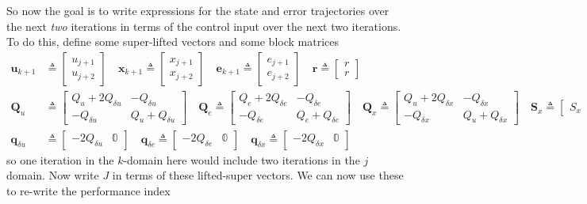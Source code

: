 \documentclass[landscape]{article}
\begin{document}
So now the goal is to write expressions for the state and error trajectories over the next \textit{two} iterations in terms of the control input over the next two iterations.  To do this, define some super-lifted vectors and some block matrices
\begin{align}
\mathbf{u}_{k+1}&\triangleq \begin{bmatrix} u_{j+1} \\ u_{j+2}\end{bmatrix} \quad
\mathbf{x}_{k+1} \triangleq \begin{bmatrix} x_{j+1} \\ x_{j+2}\end{bmatrix} \quad
\mathbf{e}_{k+1} \triangleq \begin{bmatrix} e_{j+1} \\ e_{j+2}\end{bmatrix} \quad
\mathbf{r}       \triangleq \begin{bmatrix} r       \\ r      \end{bmatrix} \\
\mathbf{Q}_u    &\triangleq \begin{bmatrix} Q_u + 2 Q_{\delta u} & - Q_{\delta u} \\ - Q_{\delta u} & Q_u + Q_{\delta u} \end{bmatrix} \quad
\mathbf{Q}_e     \triangleq \begin{bmatrix} Q_e + 2 Q_{\delta e} & - Q_{\delta e} \\ - Q_{\delta e} & Q_e + Q_{\delta e} \end{bmatrix} \quad
\mathbf{Q}_x     \triangleq \begin{bmatrix} Q_u + 2 Q_{\delta x} & - Q_{\delta x} \\ - Q_{\delta x} & Q_u + Q_{\delta x} \end{bmatrix} \quad
\mathbf{S}_x     \triangleq \begin{bmatrix} S_x  &  S_x \end{bmatrix} \quad \\
\mathbf{q}_{\delta u} &\triangleq \begin{bmatrix} -2 Q_{\delta u} & \mathbb{0} \end{bmatrix} \quad
\mathbf{q}_{\delta e}  \triangleq \begin{bmatrix} -2 Q_{\delta e} & \mathbb{0} \end{bmatrix} \quad
\mathbf{q}_{\delta x}  \triangleq \begin{bmatrix} -2 Q_{\delta x} & \mathbb{0} \end{bmatrix} \quad
\end{align}
so one iteration in the $k$-domain here would include two iterations in the $j$ domain.  Now write $J$ in terms of these lifted-super vectors.  We can now use these to re-write the performance index
\end{document}
